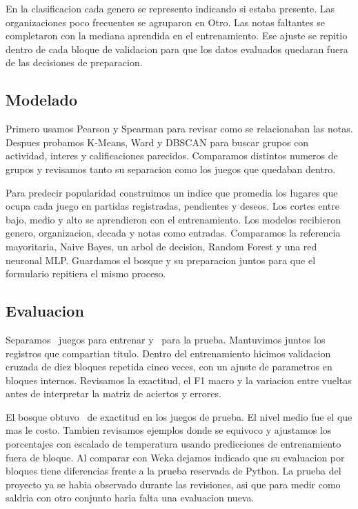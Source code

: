 En la clasificacion cada genero se represento indicando si estaba presente. Las organizaciones poco frecuentes se agruparon en Otro. Las notas faltantes se completaron con la mediana aprendida en el entrenamiento. Ese ajuste se repitio dentro de cada bloque de validacion para que los datos evaluados quedaran fuera de las decisiones de preparacion.

\subsection{Modelado}
Primero usamos Pearson y Spearman para revisar como se relacionaban las notas. Despues probamos K-Means, Ward y DBSCAN para buscar grupos con actividad, interes y calificaciones parecidos. Comparamos distintos numeros de grupos y revisamos tanto su separacion como los juegos que quedaban dentro.

Para predecir popularidad construimos un indice que promedia los lugares que ocupa cada juego en partidas registradas, pendientes y deseos. Los cortes entre bajo, medio y alto se aprendieron con el entrenamiento. Los modelos recibieron genero, organizacion, decada y notas como entradas. Comparamos la referencia mayoritaria, Naive Bayes, un arbol de decision, Random Forest y una red neuronal MLP. Guardamos el bosque y su preparacion juntos para que el formulario repitiera el mismo proceso.

\subsection{Evaluacion}
Separamos \JuegosCalibracion\ juegos para entrenar y \JuegosPrueba\ para la prueba. Mantuvimos juntos los registros que compartian titulo. Dentro del entrenamiento hicimos validacion cruzada de diez bloques repetida cinco veces, con un ajuste de parametros en bloques internos. Revisamos la exactitud, el F1 macro y la variacion entre vueltas antes de interpretar la matriz de aciertos y errores.

El bosque obtuvo \ExactitudPrueba\ de exactitud en los juegos de prueba. El nivel medio fue el que mas le costo. Tambien revisamos ejemplos donde se equivoco y ajustamos los porcentajes con escalado de temperatura usando predicciones de entrenamiento fuera de bloque. Al comparar con Weka dejamos indicado que su evaluacion por bloques tiene diferencias frente a la prueba reservada de Python. La prueba del proyecto ya se habia observado durante las revisiones, asi que para medir como saldria con otro conjunto haria falta una evaluacion nueva.

